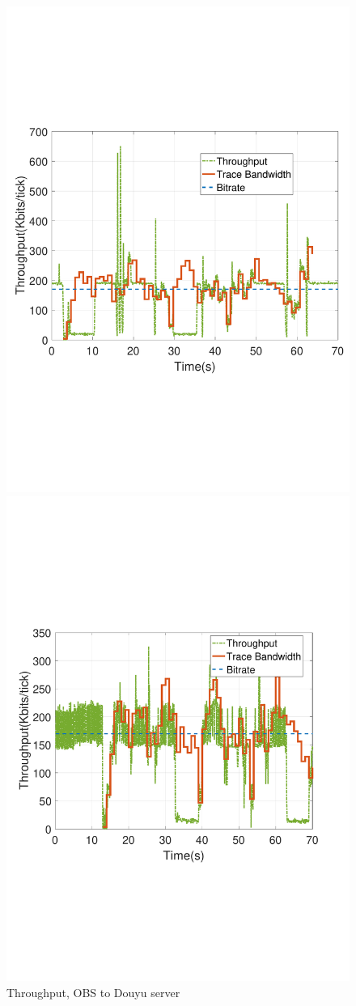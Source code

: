 \begin{figure}[htb]
  \includegraphics[width=0.8\linewidth]{fig/obs_douyu.pdf}
  \caption{Throughput, OBS to Douyu server}
  \label{fig:obs-douyu}
\endminipage\hfill
{}
  \includegraphics[width=0.8\linewidth]{fig/douyu.pdf}

\end{figure}
